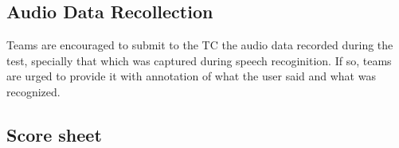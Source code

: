 \subsection {Audio Data Recollection}
Teams are encouraged to submit to the TC the audio data recorded during the test, specially that which was captured during speech recoginition. If so, teams are urged to provide it with annotation of what the user said and what was recognized.

\newpage
\subsection{Score sheet}


 

